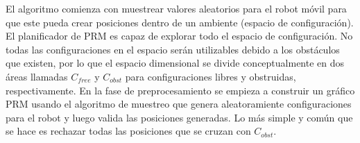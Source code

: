 El algoritmo comienza con muestrear valores aleatorios para el robot 
móvil para que este pueda crear posiciones dentro de un ambiente (espacio
de configuración). El planificador de PRM es capaz de explorar todo el 
espacio de configuración. No todas las configuraciones en el espacio serán
utilizables debido a los obstáculos que existen, por lo que el espacio
dimensional se divide conceptualmente en dos áreas llamadas $C_{free}$ y
$C_{obst}$ para configuraciones libres y obstruidas, respectivamente. En la
fase de preprocesamiento se empieza a construir un gráfico PRM usando el 
algoritmo de muestreo que genera aleatoramiente configuraciones para el
robot y luego valida las posiciones generadas. Lo más simple y común que 
se hace es rechazar todas las posiciones que se cruzan con $C_{obst}$.




